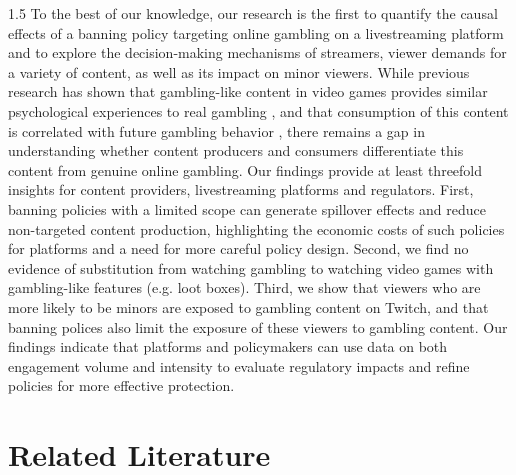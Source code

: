 \documentclass[a4paper,12pt]{article}
\begin{document}
\begin{spacing}{1.5}
To the best of our knowledge, our research is the first to quantify the causal effects of a banning policy targeting online gambling on a livestreaming platform and to explore the decision-making mechanisms of streamers, viewer demands for a variety of content, as well as its impact on minor viewers. While previous research has shown that gambling-like content in video games provides similar psychological experiences to real gambling \citep{drummond2018video,larche2021rare,amano2024makes}, and that consumption of this content is correlated with future gambling behavior \citep{zendle2019adolescents,kristiansen2020loot,close2021secondary}, there remains a gap in understanding whether content producers and consumers differentiate this content from genuine online gambling. Our findings provide at least threefold insights for content providers, livestreaming platforms and regulators. First, banning policies with a limited scope can generate spillover effects and reduce non-targeted content production, highlighting the economic costs of such policies for platforms and a need for more careful policy design. Second, we find no evidence of substitution from watching gambling to watching video games with gambling-like features (e.g. loot boxes). Third, we show that viewers who are more likely to be minors are exposed to gambling content on Twitch, and that banning polices also limit the exposure of these viewers to gambling content. Our findings indicate that platforms and policymakers can use data on both engagement volume and intensity to evaluate regulatory impacts and refine policies for more effective protection.

\section{Related Literature}\label{section-literature}


\end{spacing}
\end{document}
